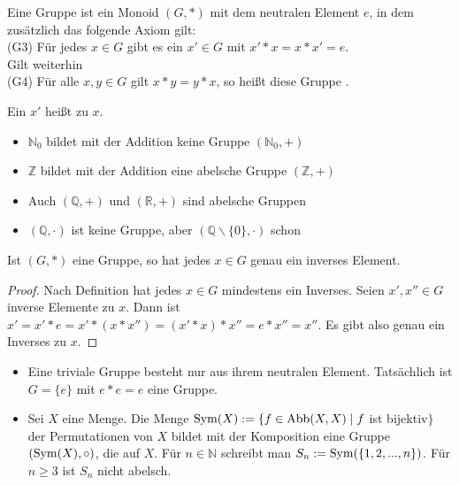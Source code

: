 \begin{definition}
	Eine Gruppe ist ein Monoid $(G,*)$ mit dem neutralen Element
	$e$, in dem zusätzlich das folgende Axiom gilt: \\
	(G3) Für jedes $x \in G$ gibt es ein $x' \in G$ mit $x'*x=x*x'=e$. \\
	Gilt weiterhin \\
	(G4) Für alle $x,y \in G$ gilt $x*y=y*x$, so heißt diese Gruppe .
\end{definition}

Ein $x'$ heißt  zu $x$. \\

\begin{example}
	\begin{itemize}
		\item $\mathbb N_0$ bildet mit der Addition keine Gruppe $(\mathbb N_0,+)$
		\item $\mathbb Z$ bildet mit der Addition eine abelsche Gruppe $(\mathbb Z,+)$
		\item Auch $(\mathbb Q,+)$ und $(\mathbb R,+)$ sind abelsche Gruppen
		\item $(\mathbb Q,\cdot)$ ist keine Gruppe, aber $(\mathbb Q\backslash\{0\},\cdot)$ schon
	\end{itemize}
\end{example}

\begin{proposition}
	Ist $(G,*)$ eine Gruppe, so hat jedes $x \in G$ genau ein inverses Element.
\end{proposition}
\begin{proof}
	Nach Definition hat jedes $x\in G$ mindestens ein Inverses. Seien $x',x''\in G$ inverse Elemente zu $x$. Dann ist 
	$x'=x'*e=x'*(x*x'')=(x'*x)*x''=e*x''=x''$. Es gibt also genau ein Inverses zu $x$.
\end{proof}

\begin{example}
	\begin{itemize}
		\item Eine triviale Gruppe besteht nur aus ihrem neutralen Element. Tatsächlich ist $G=\{e\}$ mit
		$e*e=e$ eine Gruppe.
		\item Sei $X$ eine Menge. Die Menge $\operatorname{Sym}(X) := \{f \in \operatorname{Abb}(X,X) \mid f$ ist bijektiv$\}$ der
		Permutationen von $X$ bildet mit der Komposition eine Gruppe $(\operatorname{Sym}(X),\circ)$, die 
		 auf $X$. Für $n \in \mathbb N$ schreibt man $S_n := \operatorname{Sym}(\{1,2,...,n\})$. 
		Für $n \ge 3$ ist $S_n$ nicht abelsch.
	\end{itemize}
\end{example}

